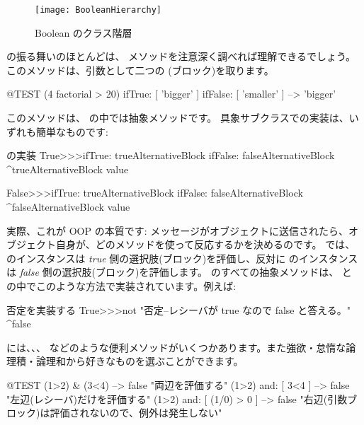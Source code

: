 \documentclass[a4paper,10pt,twoside]{book}
\begin{document}
\begin{figure}[ht]
  {\centerline {\texttt{[image: BooleanHierarchy]}}}
\caption{Boolean のクラス階層 }
\end{figure}

 の振る舞いのほとんどは、 メソッドを注意深く調べれば理解できるでしょう。このメソッドは、引数として二つの  (ブロック)を取ります。

\begin{code}{@TEST}
(4 factorial > 20) ifTrue: [ 'bigger' ] ifFalse: [ 'smaller' ] --> 'bigger'
\end{code}

このメソッドは、 の中では抽象メソッドです。
具象サブクラスでの実装は、いずれも簡単なものです:

\begin{method}{ の実装}
True>>>ifTrue: trueAlternativeBlock ifFalse: falseAlternativeBlock 
    ^trueAlternativeBlock value

False>>>ifTrue: trueAlternativeBlock ifFalse: falseAlternativeBlock 
    ^falseAlternativeBlock value
\end{method}

実際、これが OOP の本質です: メッセージがオブジェクトに送信されたら、オブジェクト自身が、どのメソッドを使って反応するかを決めるのです。 では、 のインスタンスは \emph{true} 側の選択肢(ブロック)を評価し、反対に  のインスタンスは \emph{false} 側の選択肢(ブロック)を評価します。 のすべての抽象メソッドは、 と  の中でこのような方法で実装されています。例えば:

\begin{method}{否定を実装する}
True>>>not
    "否定--レシーバが true なので false と答える。"
    ^false
\end{method}

 には、、、 などのような便利メソッドがいくつかあります。また強欲・怠惰な論理積・論理和から好きなものを選ぶことができます。

\begin{code}{@TEST}
(1>2) & (3<4)              --> false    "両辺を評価する"
(1>2) and: [ 3<4 ]        --> false    "左辺(レシーバ)だけを評価する"
(1>2) and: [ (1/0) > 0 ] --> false    "右辺(引数ブロック)は評価されないので、例外は発生しない"
\end{code}
\end{document}

